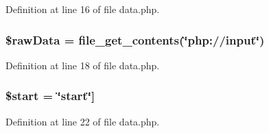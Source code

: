 \-Definition at line 16 of file data.\-php.

\hypertarget{administration_2services_2data_8php_ad66cfed6c1f454fbc3f3c6fdc8842a7b}{
\subsubsection[{\$raw\-Data}]{\setlength{\rightskip}{0pt plus 5cm}\$raw\-Data = file\-\_\-get\-\_\-contents(\char`\"{}php\-://input\char`\"{})}}\label{administration_2services_2data_8php_ad66cfed6c1f454fbc3f3c6fdc8842a7b}


\-Definition at line 18 of file data.\-php.

\hypertarget{administration_2services_2data_8php_a50a00e7de77365e00b117e73aa82fb9b}{
\subsubsection[{\$start}]{\setlength{\rightskip}{0pt plus 5cm}\$start = \char`\"{}start\char`\"{}\mbox{]}}}\label{administration_2services_2data_8php_a50a00e7de77365e00b117e73aa82fb9b}


\-Definition at line 22 of file data.\-php.

